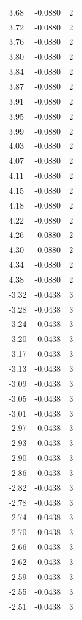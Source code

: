 \begin{longtable}{lrr}
  3.68 & -0.0880 & 2 \\
  3.72 & -0.0880 & 2 \\
  3.76 & -0.0880 & 2 \\
  3.80 & -0.0880 & 2 \\
  3.84 & -0.0880 & 2 \\
  3.87 & -0.0880 & 2 \\
  3.91 & -0.0880 & 2 \\
  3.95 & -0.0880 & 2 \\
  3.99 & -0.0880 & 2 \\
  4.03 & -0.0880 & 2 \\
  4.07 & -0.0880 & 2 \\
  4.11 & -0.0880 & 2 \\
  4.15 & -0.0880 & 2 \\
  4.18 & -0.0880 & 2 \\
  4.22 & -0.0880 & 2 \\
  4.26 & -0.0880 & 2 \\
  4.30 & -0.0880 & 2 \\
  4.34 & -0.0880 & 2 \\
  4.38 & -0.0880 & 2 \\
  -3.32 & -0.0438 & 3 \\
  -3.28 & -0.0438 & 3 \\
  -3.24 & -0.0438 & 3 \\
  -3.20 & -0.0438 & 3 \\
  -3.17 & -0.0438 & 3 \\
  -3.13 & -0.0438 & 3 \\
  -3.09 & -0.0438 & 3 \\
  -3.05 & -0.0438 & 3 \\
  -3.01 & -0.0438 & 3 \\
  -2.97 & -0.0438 & 3 \\
  -2.93 & -0.0438 & 3 \\
  -2.90 & -0.0438 & 3 \\
  -2.86 & -0.0438 & 3 \\
  -2.82 & -0.0438 & 3 \\
  -2.78 & -0.0438 & 3 \\
  -2.74 & -0.0438 & 3 \\
  -2.70 & -0.0438 & 3 \\
  -2.66 & -0.0438 & 3 \\
  -2.62 & -0.0438 & 3 \\
  -2.59 & -0.0438 & 3 \\
  -2.55 & -0.0438 & 3 \\
  -2.51 & -0.0438 & 3 \\

\end{longtable}
